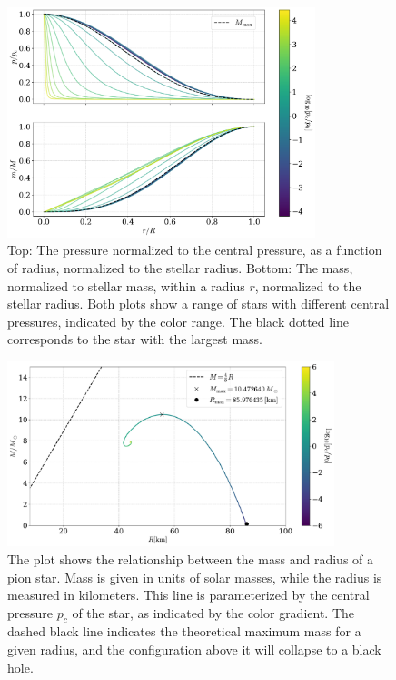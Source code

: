 \begin{figure}[!h]
    \centering
    \includegraphics[width=0.8\textwidth]{../scripts/figurer/pion_star/pressure_mass_pion_star.pdf}
    \caption{
        Top: The pressure normalized to the central pressure, as a function of radius, normalized to the stellar radius.
    Bottom: The mass, normalized to stellar mass, within a radius $r$, normalized to the stellar radius.
    Both plots show a range of stars with different central pressures, indicated by the color range.
    The black dotted line corresponds to the star with the largest mass.}
    \label{fig: pressure and mass for tree-level pion star}
\end{figure}

\begin{figure}[!h]
    \centering
    \includegraphics[width=0.85\textwidth]{../scripts/figurer/pion_star/mass_radius_pion_star.pdf}
    \caption{
        The plot shows the relationship between the mass and radius of a pion star. Mass is given in units of solar masses, while the radius is measured in kilometers.
        This line is parameterized by the central pressure $p_c$ of the star, as indicated by the color gradient.
        The dashed black line indicates the theoretical maximum mass for a given radius, and the configuration above it will collapse to a black hole.
        }
        \label{fig: mass radius relation tree-level pion star}
\end{figure}



